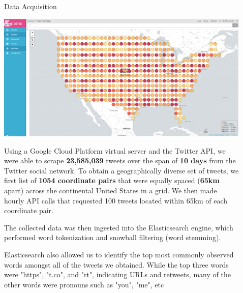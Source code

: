 \documentclass[final]{beamer}
\newlength{\sepwid}
\newlength{\onecolwid}
\newlength{\twocolwid}
\begin{document}
\begin{frame}[t]
\begin{columns}[t]
\begin{column}{\onecolwid}
\begin{block}{Data Acquisition}

\includegraphics[width=1\linewidth]{screenshot.png} 
\newline


Using a Google Cloud Platform virtual server and the Twitter API, we were able to scrape \textbf{23,585,039} tweets over the span of \textbf{10 days} from the Twitter social network. To obtain a geographically diverse set of tweets, we first list of \textbf{1054 coordinate pairs} that were equally spaced (\textbf{65km} apart) across the continental United States in a grid. We then made hourly API calls that requested 100 tweets located within 65km of each coordinate pair. \newline


The collected data was then ingested into the Elasticsearch engine, which performed word tokenization and snowball filtering (word stemming). \newline

Elasticsearch also allowed us to identify the top most commonly observed words amongst all of the tweets we obtained. While the top three words were "https", "t.co", and "rt", indicating URLs and retweets, many of the other words were pronouns such as "you", "me", etc

\end{block}


\end{column} %

\begin{column}{\sepwid}\end{column} %

\begin{column}{\twocolwid} %


\end{column}
\end{columns}
\end{frame}
\end{document}
